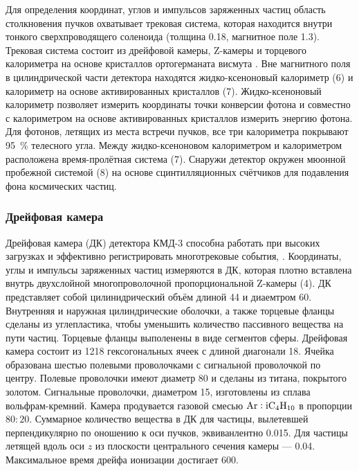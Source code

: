 Для определения координат,
углов и импульсов заряженных частиц область столкновения пучков
охватывает трековая система,
которая находится внутри тонкого сверхпроводящего соленоида (толщина
\SI{0.18}{\Xrad},
магнитное поле \SI{1.3}{\teslaru}). 
Трековая система состоит из дрейфовой камеры,
Z-камеры и торцевого калориметра на основе кристаллов ортогерманата висмута .
Вне магнитного поля в цилиндрической части детектора находятся жидко-ксеноновый калориметр (6)
и калориметр на основе активированных кристаллов (7). 
Жидко-ксеноновый калориметр позволяет измерить координаты точки конверсии фотона и совместно с калориметром на основе активированных кристаллов  измерить энергию фотона.
Для фотонов, летящих из места встречи пучков, все три калориметра покрывают \SI{95}{\percent} телесного угла.
Между жидко-ксеноновом калориметром и  калориметром расположена время-пролётная система (7).
Снаружи детектор окружен мюонной пробежной системой (8) на основе сцинтилляционных счётчиков для
подавления фона космических частиц.


\subsubsection{Дрейфовая камера}\label{sec:dc}

Дрейфовая камера (ДК) детектора КМД-3 способна работать при высоких загрузках и эффективно регистрировать многотрековые события, \cite{driftChCMD3Grancagnolo2010}. 
Координаты, углы и импульсы заряженных частиц измеряются в ДК,
которая плотно вставлена внутрь двухслойной многопроволочной пропорциональной Z-камеры (4). 
ДК представляет собой цилинидрический объём длиной \SI{44}{\cmr} и диаемтром \SI{60}{\cmr}.
Внутренняя и наружная цилиндрические оболочки,
а также торцевые фланцы сделаны из углепластика,
чтобы уменьшить количество пассивного вещества на пути частиц.
Торцевые фланцы выполенены в виде сегментов сферы.
Дрейфовая камера состоит из \num{1218} гексогональных ячеек с длиной диагонали \SI{18}{\mmr}.
Ячейка образована шестью полевыми проволочками с сигнальной проволочкой по центру.
Полевые проволочки имеют диаметр \SI{80}{\umr} и сделаны из титана, покрытого золотом. 
Сигнальные проволочки,
диаметром \SI{15}{\umr},
изготовлены из сплава вольфрам-кремний.
Камера продувается газовой смесью $\ce{Ar}:\ce{iC4H10}$ в пропорции $80:20$.
Суммарное количество вещества в ДК для частицы,
вылетевшей перпендикулярно по оношению к оси пучков,
эквиванлентно \SI{0.015}{\Xrad}.
Для частицы летящей вдоль оси $z$ из плоскости центрального сечения камеры
--- \SI{0.04}{\Xrad}.
Максимальное время дрейфа ионизации достигает \SI{600}{\nsr}.

